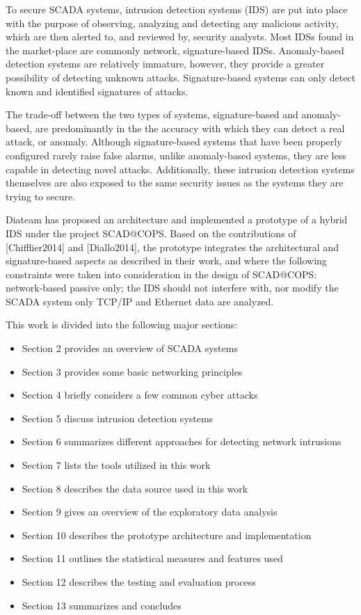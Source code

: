 \documentclass[12pt,]{article}
\begin{document}
To secure SCADA systems, intrusion detection systems (IDS) are put into
place with the purpose of observing, analyzing and detecting any
malicious activity, which are then alerted to, and reviewed by, security
analysts. Most IDSs found in the market-place are commonly network,
signature-based IDSs. Anomaly-based detection systems are relatively
immature, however, they provide a greater possibility of detecting
unknown attacks. Signature-based systems can only detect known and
identified signatures of attacks.

The trade-off between the two types of systems, signature-based and
anomaly-based, are predominantly in the the accuracy with which they can
detect a real attack, or anomaly. Although signature-based systems that
have been properly configured rarely raise false alarms, unlike
anomaly-based systems, they are less capable in detecting novel attacks.
Additionally, these intrusion detection systems themselves are also
exposed to the same security issues as the systems they are trying to
secure.

Diateam has proposed an architecture and implemented a prototype of a
hybrid IDS under the project SCAD@COPS. Based on the contributions of
{[}Chifflier2014{]} and {[}Diallo2014{]}, the prototype integrates the
architectural and signature-based aspects as described in their work,
and where the following constraints were taken into consideration in the
design of SCAD@COPS: network-based passive only; the IDS should not
interfere with, nor modify the SCADA system only TCP/IP and Ethernet
data are analyzed.

This work is divided into the following major sections:

\begin{itemize}
\itemsep1pt\parskip0pt
\item
  Section 2 provides an overview of SCADA systems
\item
  Section 3 provides some basic networking principles
\item
  Section 4 briefly considers a few common cyber attacks
\item
  Section 5 discuss intrusion detection systems
\item
  Section 6 summarizes different approaches for detecting network
  intrusions
\item
  Section 7 lists the tools utilized in this work
\item
  Section 8 describes the data source used in this work
\item
  Section 9 gives an overview of the exploratory data analysis
\item
  Section 10 describes the prototype architecture and implementation
\item
  Section 11 outlines the statistical measures and features used
\item
  Section 12 describes the testing and evaluation process
\item
  Section 13 summarizes and concludes
\end{itemize}
\end{document}
